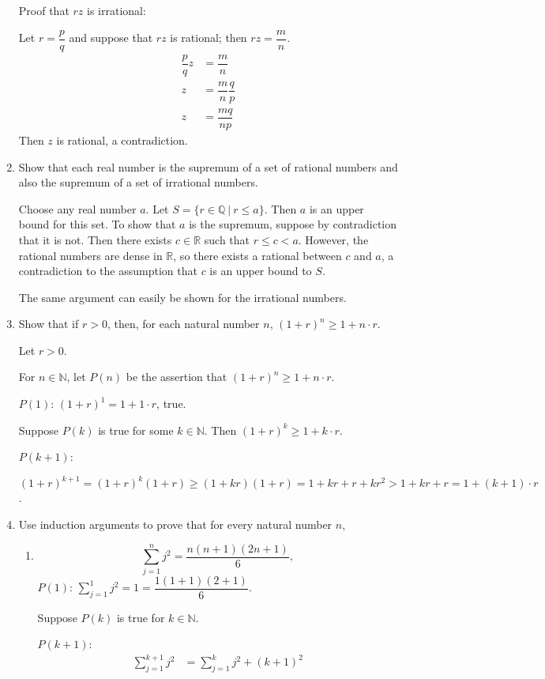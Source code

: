 \begin{enumerate}
	Proof that $rz$ is irrational:\par
	Let $r = \dfrac{p}{q}$ and suppose that $rz$ is rational; then $rz = \dfrac{m}{n}$.
	\begin{align*}
		\dfrac{p}{q}z &= \dfrac{m}{n}\\
		z &=\dfrac{m}{n} \dfrac{q}{p}\\
		z &= \dfrac{mq}{np}
	\end{align*}
	Then $z$ is rational, a contradiction.
	\item Show that each real number is the supremum of a set of rational numbers and also the supremum of a set of irrational numbers.\par
	Choose any real number $a$. Let $S=\{ r \in \mathbb{Q}\ |\ r\le a\}$.
	Then $a$ is an upper bound for this set. To show that $a$ is the supremum, suppose by contradiction that it is not.
	Then there exists $c \in \mathbb{R}$ such that $r \le c < a$. 
	However, the rational numbers are dense in $\mathbb{R}$, so there exists a rational between $c$ and $a$, a contradiction to the assumption that $c$ is an upper bound to $S$. 
	\par
	The same argument can easily be shown for the irrational numbers.
	\item Show that if $r>0$, then, for each natural number $n$, $(1+r)^n \ge 1+n \cdot r$.\par
	Let $r>0$.\par
	For $n \in \mathbb{N}$, let $P(n)$ be the assertion that $(1+r)^n \ge 1+n \cdot r$.\par
	$P(1)$: $(1+r)^1 = 1+1 \cdot r$, true.\par
	Suppose $P(k)$ is true for some $k \in \mathbb{N}$. Then $(1+r)^k \ge 1+k \cdot r$. \par
	$P(k+1)$:\par
	$(1+r)^{k+1} = (1+r)^k(1+r) \ge (1+kr)(1+r) = 1+ kr + r +kr^2 > 1+ kr + r = 1+(k+1) \cdot r$.
	\item Use induction arguments to prove that for every natural number $n$,
	\begin{enumerate}[label=(\roman*),align=left]
        \item \[ \sum_{j=1}^n j^2 = \dfrac{n(n+1)(2n+1)}{6}, \]
        $P(1)$: $\sum_{j=1}^1 j^2 = 1 = \dfrac{1(1+1)(2+1)}{6}$.\par
		Suppose $P(k)$ is true for $k \in \mathbb{N}$.\par
		$P(k+1)$: 
		\begin{align*}
			\sum_{j=1}^{k+1} j^2 &= \sum_{j=1}^{k} j^2 + (k+1)^2 \\

\end{align*}
\end{enumerate}
\end{enumerate}
